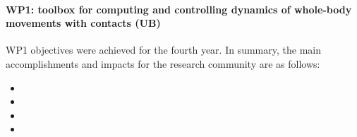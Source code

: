 

\paragraph*{WP1: toolbox for computing and controlling dynamics of whole-body movements with contacts (UB)}

WP1 objectives were achieved for the fourth year. In summary, the main accomplishments and impacts for the research community are as follows: 

\begin{itemize}

\item 
\item 
\item 
\item 

 \end{itemize}


